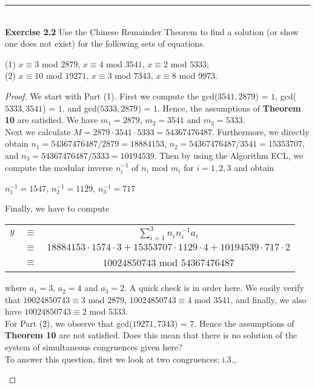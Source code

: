 \documentclass[a4paper]{article}
\begin{document}
\noindent\rule{12cm}{0.4pt}\\
\noindent \textbf{Exercise 2.2} Use the Chinese Remainder Theorem to find a solution (or show one does not exist) for the following sets of equations.
\begin{center}
(1) $x \equiv 3$ mod $2879$, $x \equiv 4$ mod $3541$, $x \equiv 2$ mod $5333$;\\
(2) $x \equiv 10$ mod $19271$, $x \equiv 3$ mod $7343$, $x \equiv 8$ mod $9973$.
\end {center}
\begin{proof}
We start with Part (1). First we compute the gcd($3541,2879$) = $1$, gcd($5333, 3541$) = $1$, and gcd($5333, 2879$) = $1$. Hence, the assumptions of \textbf{Theorem 10} are satisfied. We have $m_{1} = 2879$, $m_{2} = 3541$ and $m_{3} = 5333$. \\
Next we calculate $M = 2879 \cdot 3541 \cdot 5333 = 54367476487$. Furthermore, we directly obtain $n_{1} = 54367476487 / 2879 = 18884153$, $n_{2} = 54367476487 / 3541 = 15353707$, and $n_{3} = 54367476487 / 5333 = 10194539$. Then by using the Algorithm ECL, we compute the modular inverse $n_{i}^{-1}$ of $n_{i}$ mod $m_{i}$ for $i = 1,2,3$ and obtain \\
\begin{center}
$n_{1}^{-1} = 1547$, $n_{2}^{-1} = 1129$, $n_{3}^{-1} = 717$
\end{center}
Finally, we have to compute
\begin{center}
\begin{tabular}{c c c}
$y$ & $\equiv$ & $\sum_{i=1}^{3}{n_{i}n_{i}^{-1}a_{i}}$ \\
& $\equiv$ & $18884153 \cdot 1574 \cdot 3 + 15353707 \cdot 1129 \cdot 4 + 10194539 \cdot 717 \cdot 2$ \\
& $\equiv$ & $10024850743$ mod $54367476487$
\end{tabular}
\end{center}
where $a_{1} = 3$, $a_{2} = 4$ and $a_{3} = 2$. A quick check is in order here. We easily verify that $10024850743 \equiv 3$ mod $2879$, $10024850743 \equiv 4$ mod $3541$, and finally, we also have $10024850743 \equiv 2$ mod $5333$. \\
For Part (2), we observe that gcd($19271, 7343$) = 7. Hence the assumptions of \textbf{Theorem 10} are not satisfied. Does this mean that there is no solution of the system of simultaneous congruences given here? \\
To answer this question, first we look at two congruences; i.3.,
\begin{center}

\end{center}
\end{proof}
\end{document}
